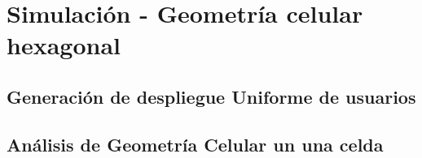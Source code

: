 
\chapter{Simulación - Geometría celular hexagonal} %

\label{AppendixA} %

\section{Generación de despliegue Uniforme de usuarios}

\section{Análisis de Geometría Celular un una celda}
